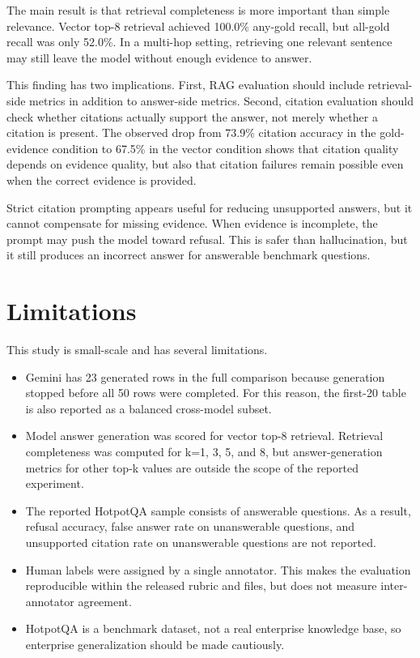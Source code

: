 \documentclass[10pt,twocolumn]{article}
\begin{document}
The main result is that retrieval completeness is more important than simple relevance. Vector top-8 retrieval achieved 100.0\% any-gold recall, but all-gold recall was only 52.0\%. In a multi-hop setting, retrieving one relevant sentence may still leave the model without enough evidence to answer.

This finding has two implications. First, RAG evaluation should include retrieval-side metrics in addition to answer-side metrics. Second, citation evaluation should check whether citations actually support the answer, not merely whether a citation is present. The observed drop from 73.9\% citation accuracy in the gold-evidence condition to 67.5\% in the vector condition shows that citation quality depends on evidence quality, but also that citation failures remain possible even when the correct evidence is provided.

Strict citation prompting appears useful for reducing unsupported answers, but it cannot compensate for missing evidence. When evidence is incomplete, the prompt may push the model toward refusal. This is safer than hallucination, but it still produces an incorrect answer for answerable benchmark questions.

\section{Limitations}

This study is small-scale and has several limitations.

\begin{itemize}[leftmargin=*]
    \item Gemini has 23 generated rows in the full comparison because generation stopped before all 50 rows were completed. For this reason, the first-20 table is also reported as a balanced cross-model subset.
    \item Model answer generation was scored for vector top-8 retrieval. Retrieval completeness was computed for k=1, 3, 5, and 8, but answer-generation metrics for other top-k values are outside the scope of the reported experiment.
    \item The reported HotpotQA sample consists of answerable questions. As a result, refusal accuracy, false answer rate on unanswerable questions, and unsupported citation rate on unanswerable questions are not reported.
    \item Human labels were assigned by a single annotator. This makes the evaluation reproducible within the released rubric and files, but does not measure inter-annotator agreement.
    \item HotpotQA is a benchmark dataset, not a real enterprise knowledge base, so enterprise generalization should be made cautiously.
\end{itemize}
\end{document}

